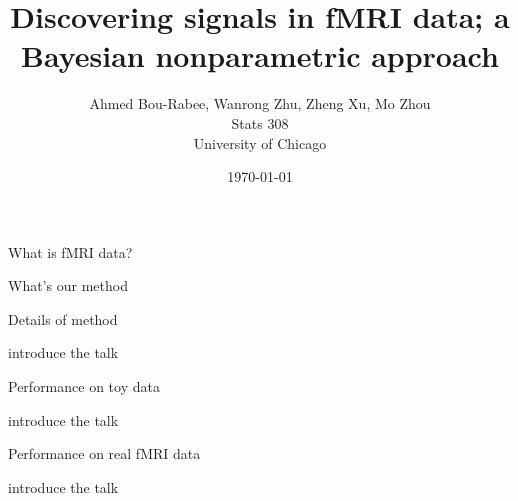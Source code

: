 \documentclass[10pt,mathserif]{beamer}
\title{\large \bfseries Discovering signals in fMRI data; 
a Bayesian nonparametric approach }
\author{Ahmed Bou-Rabee, Wanrong Zhu, Zheng Xu, Mo Zhou\\[3ex]
Stats 308\\
University of Chicago}
\date{\today}
\begin{document}
\frame{
\thispagestyle{empty}
\titlepage
}

\begin{frame} {What is fMRI data?}
\BIT
\item  
\item 
\EIT
\end{frame}

\begin{frame} {What's our method}
\BIT
\item  
\item 
\EIT
\end{frame}

\begin{frame} {Details of method}
\BIT
\item  introduce the talk 
\item 
\EIT
\end{frame}

\begin{frame} {Performance on toy data}
\BIT
\item  introduce the talk 
\item 
\EIT
\end{frame}

\begin{frame} {Performance on real fMRI data}
\BIT
\item  introduce the talk 
\item 
\EIT
\end{frame}
\end{document}
